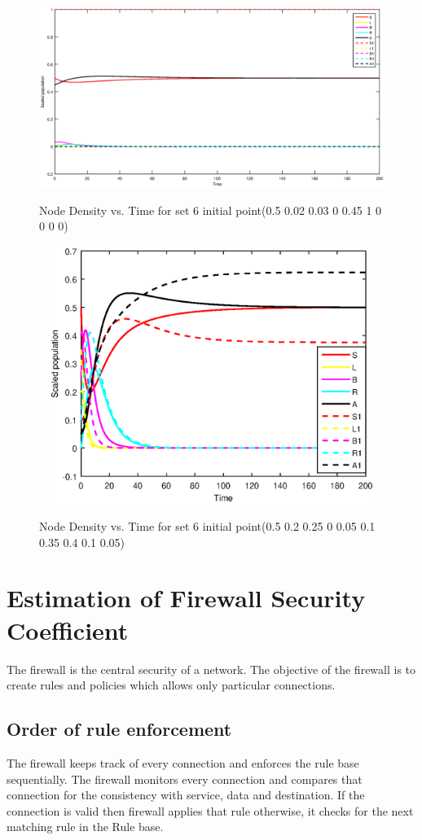 \newpage
\begin{figure}[h!]
\centering
  \includegraphics[width=7.0in]{8.eps}\\
  \caption{Node Density vs. Time for set 6 initial point(0.5 0.02 0.03 0 0.45 1 0 0 0 0)}\label{fig:ff7}
\end{figure}
\begin{figure}[h!]
\centering
  \includegraphics[width=7.0in,height=3.3in]{9.eps}\\
  \caption{Node Density vs. Time for set 6 initial point(0.5 0.2 0.25 0 0.05 0.1 0.35 0.4 0.1 0.05)}\label{fig:ff8}
\end{figure}

\newpage
\section{Estimation of Firewall Security Coefficient}
The firewall is the central security of a network. The objective of the firewall is to create rules and policies which allows only particular connections.
\subsection{Order of rule enforcement}
The firewall keeps track of every connection and enforces the rule base sequentially. The firewall monitors every connection and compares that connection for the consistency with service, data and destination. If the connection is valid then firewall applies that rule otherwise, it checks for the next matching rule in the Rule base.

